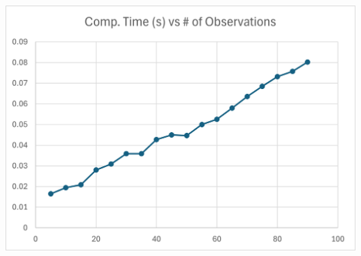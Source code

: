 \documentclass[12pt]{article}
\begin{document}
    \begin{center}
        \includegraphics{timescaling.png}
    \end{center}

    
\end{document}
